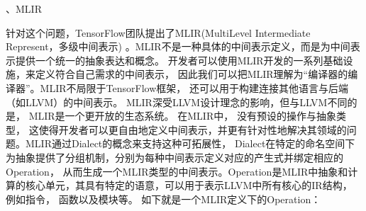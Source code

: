 \documentclass[letterpaper,10pt,english]{sphinxmanual}
\begin{document}
、MLIR

\sphinxAtStartPar
针对这个问题，TensorFlow团队提出了MLIR(Multi\sphinxhyphen{}Level Intermediate
Represent，多级中间表示)
。MLIR不是一种具体的中间表示定义，而是为中间表示提供一个统一的抽象表达和概念。
开发者可以使用MLIR开发的一系列基础设施，来定义符合自己需求的中间表示，
因此我们可以把MLIR理解为“编译器的编译器”。MLIR不局限于TensorFlow框架，
还可以用于构建连接其他语言与后端（如LLVM）的中间表示。
MLIR深受LLVM设计理念的影响，但与LLVM不同的是，
MLIR是一个更开放的生态系统。 在MLIR中， 没有预设的操作与抽象类型，
这使得开发者可以更自由地定义中间表示，并更有针对性地解决其领域的问题。MLIR通过Dialect的概念来支持这种可拓展性，
Dialect在特定的命名空间下为抽象提供了分组机制，分别为每种中间表示定义对应的产生式并绑定相应的Operation，
从而生成一个MLIR类型的中间表示。Operation是MLIR中抽象和计算的核心单元，其具有特定的语意，可以用于表示LLVM中所有核心的IR结构，
例如指令， 函数以及模块等。 如下就是一个MLIR定义下的Operation：
\end{document}
